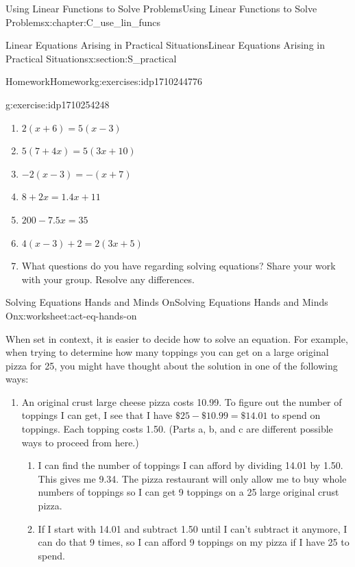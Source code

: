 \documentclass[oneside,10pt,]{book}
\numberwithin{equation}{chapter}
\begin{document}
\begin{chapterptx}{Using Linear Functions to Solve Problems}{}{Using Linear Functions to Solve Problems}{}{}{x:chapter:C_use_lin_funcs}
\begin{sectionptx}{Linear Equations Arising in Practical Situations}{}{Linear Equations Arising in Practical Situations}{}{}{x:section:S_practical}
\begin{exercises-subsection}{Homework}{}{Homework}{}{}{g:exercises:idp1710244776}
\begin{divisionexercise}{3}{}{}{g:exercise:idp1710254248}
\begin{enumerate}[font=\bfseries,label=(\alph*),ref=\alph*]
\item{}\(2 \left( x + 6 \right) = 5 \left( x - 3 \right)\)%
\item{}\(5 \left( 7 + 4x \right) = 5 \left( 3x + 10 \right)\)%
\item{}\(-2 \left( x - 3 \right) = - \left( x + 7 \right)\)%
\item{}\(8 + 2x = 1.4x + 11\)%
\item{}\(200 - 7.5x = 35\)%
\item{}\(4 \left( x - 3 \right) + 2 = 2 \left( 3x + 5 \right)\)%
\item{}What questions do you have regarding solving equations? Share your work with your group. Resolve any differences.%
\end{enumerate}
\end{divisionexercise}%
\end{exercises-subsection}
%
%
\typeout{************************************************}
\typeout{************************************************}
%
\begin{worksheet-subsection}{Solving Equations \textemdash{} Hands and Minds On}{}{Solving Equations \textemdash{} Hands and Minds On}{}{}{x:worksheet:act-eq-hands-on}
\begin{introduction}{}%
When set in context, it is easier to decide how to solve an equation. For example, when trying to determine how many toppings you can get on a large original pizza for \textdollar{}25, you might have thought about the solution in one of the following ways:%
\begin{enumerate}[label=(\alph*)]
\item{}An original crust large cheese pizza costs \textdollar{}10.99. To figure out the number of toppings I can get, I see that I have \(\$25 - \$10.99 = \$14.01\) to spend on toppings. Each topping costs \textdollar{}1.50. (Parts a, b, and c are different possible ways to proceed from here.)%
\begin{enumerate}[label=\roman*.]
\item{}I can find the number of toppings I can afford by dividing \textdollar{}14.01 by \textdollar{}1.50. This gives me 9.34. The pizza restaurant will only allow me to buy whole numbers of toppings so I can get 9 toppings on a \textdollar{}25 large original crust pizza.%
\item{}If I start with \textdollar{}14.01 and subtract 1.50 until I can't subtract it anymore, I can do that 9 times, so I can afford 9 toppings on my pizza if I have \textdollar{}25 to spend.%

\end{enumerate}
\end{enumerate}
\end{introduction}
\end{worksheet-subsection}
\end{sectionptx}
\end{chapterptx}
\end{document}
